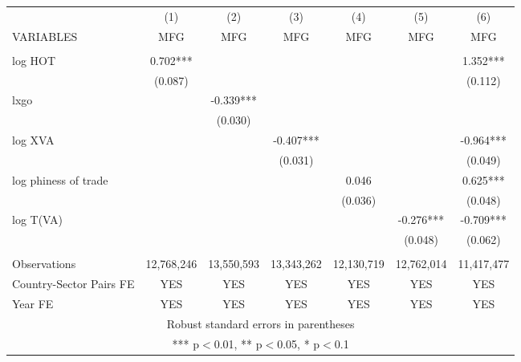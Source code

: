 \documentclass[]{article}
\begin{document}
\begin{tabular}{lcccccc} \hline
 & (1) & (2) & (3) & (4) & (5) & (6) \\
VARIABLES & MFG & MFG & MFG & MFG & MFG & MFG \\ \hline
 &  &  &  &  &  &  \\
log HOT & 0.702*** &  &  &  &  & 1.352*** \\
 & (0.087) &  &  &  &  & (0.112) \\
lxgo &  & -0.339*** &  &  &  &  \\
 &  & (0.030) &  &  &  &  \\
log XVA &  &  & -0.407*** &  &  & -0.964*** \\
 &  &  & (0.031) &  &  & (0.049) \\
log phiness of trade &  &  &  & 0.046 &  & 0.625*** \\
 &  &  &  & (0.036) &  & (0.048) \\
log T(VA) &  &  &  &  & -0.276*** & -0.709*** \\
 &  &  &  &  & (0.048) & (0.062) \\
 &  &  &  &  &  &  \\
Observations & 12,768,246 & 13,550,593 & 13,343,262 & 12,130,719 & 12,762,014 & 11,417,477 \\
Country-Sector Pairs FE & YES & YES & YES & YES & YES & YES \\
 Year FE & YES & YES & YES & YES & YES & YES \\ \hline
\multicolumn{7}{c}{ Robust standard errors in parentheses} \\
\multicolumn{7}{c}{ *** p$<$0.01, ** p$<$0.05, * p$<$0.1} \\
\end{tabular}
\end{document}
